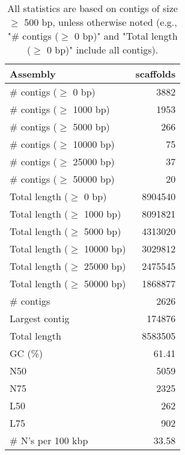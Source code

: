 \documentclass[12pt,a4paper]{article}
\begin{document}
\begin{table}[ht]
\begin{center}
\caption{All statistics are based on contigs of size $\geq$ 500 bp, unless otherwise noted (e.g., "\# contigs ($\geq$ 0 bp)" and "Total length ($\geq$ 0 bp)" include all contigs).}
\begin{tabular}{|l*{1}{|r}|}
\hline
Assembly & scaffolds \\ \hline
\# contigs ($\geq$ 0 bp) & 3882 \\ \hline
\# contigs ($\geq$ 1000 bp) & 1953 \\ \hline
\# contigs ($\geq$ 5000 bp) & 266 \\ \hline
\# contigs ($\geq$ 10000 bp) & 75 \\ \hline
\# contigs ($\geq$ 25000 bp) & 37 \\ \hline
\# contigs ($\geq$ 50000 bp) & 20 \\ \hline
Total length ($\geq$ 0 bp) & 8904540 \\ \hline
Total length ($\geq$ 1000 bp) & 8091821 \\ \hline
Total length ($\geq$ 5000 bp) & 4313020 \\ \hline
Total length ($\geq$ 10000 bp) & 3029812 \\ \hline
Total length ($\geq$ 25000 bp) & 2475545 \\ \hline
Total length ($\geq$ 50000 bp) & 1868877 \\ \hline
\# contigs & 2626 \\ \hline
Largest contig & 174876 \\ \hline
Total length & 8583505 \\ \hline
GC (\%) & 61.41 \\ \hline
N50 & 5059 \\ \hline
N75 & 2325 \\ \hline
L50 & 262 \\ \hline
L75 & 902 \\ \hline
\# N's per 100 kbp & 33.58 \\ \hline
\end{tabular}
\end{center}
\end{table}
\end{document}
